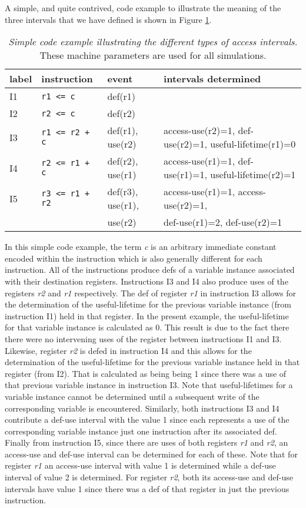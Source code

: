 \documentclass[10pt,dvips]{article}
\begin{document}
A simple, and quite contrived, 
code example to illustrate the meaning of the three
intervals that we have defined is shown in Figure \ref{tab:code1}.
%
\begin{table}
\begin{center}
\caption{{\em Simple code example illustrating the different types of
access intervals.}
These machine parameters are used for all simulations.}
\label{tab:code1}
\vspace{+0.1in}
\begin{tabular}{l|l|l|l}
\hline 
label&instruction&event&intervals determined\\
\hline 
\hline 
I1&\verb"r1 <= c"&def(r1)& \\
\hline
I2&\verb"r2 <= c"&def(r2)& \\
\hline
I3&\verb"r1 <= r2 + c"&def(r1), use(r2)&
access-use(r2)=1, def-use(r2)=1, useful-lifetime(r1)=0\\
\hline
I4&\verb"r2 <= r1 + c"&def(r2), use(r1)&
access-use(r1)=1, def-use(r1)=1, useful-lifetime(r2)=1\\
\hline
I5&\verb"r3 <= r1 + r2"&def(r3), use(r1),&
access-use(r1)=1, access-use(r2)=1,\\
 & &use(r2)&def-use(r1)=2, def-use(r2)=1\\
\hline
\end{tabular}
\end{center}
\end{table}
%
In this simple code example, the term \textit{c} is an arbitrary
immediate constant encoded within the instruction which is
also generally different for each instruction.
All of the instructions produce defs of a variable instance
associated with their destination registers.
Instructions I3 and I4 also produce uses of the registers \textit{r2}
and \textit{r1} respectively.
The def of register \textit{r1} in instruction I3 allows for the
determination of the useful-lifetime for the previous variable
instance (from instruction I1) held in that register.  
In the present example, the useful-lifetime for that
variable instance is calculated as 0.
This result is due to the fact there there were no intervening uses
of the register between instructions I1 and I3.
Likewise, register \textit{r2} is defed in instruction I4 and this
allows for the determination of the useful-lifetime for the previous
variable instance held in that register (from I2).  
That is calculated as being
being 1 since there was a use of that previous variable instance in
instruction I3.
Note that useful-lifetimes for a variable instance
cannot be determined until a subsequent
write of the corresponding variable is encountered.
Similarly, both instructions I3 and I4 contribute a def-use interval
with the value 1 since each represents a use of the corresponding
variable instance just one instruction after its associated def.
Finally from instruction I5, since there are uses of both registers
\textit{r1} and \textit{r2}, an access-use and def-use interval
can be determined for each of these.
Note that for register \textit{r1} an access-use interval with value
1 is determined while a def-use interval of value 2 is determined.
For register \textit{r2}, both its access-use and def-use intervals
have value 1 since there was a def of that register in just
the previous instruction.
\end{document}
